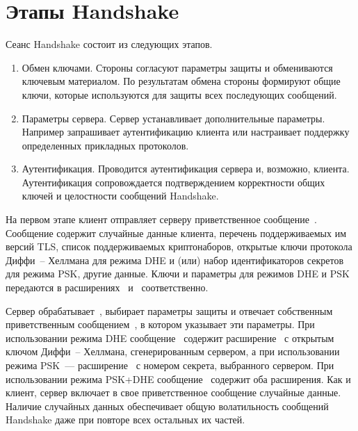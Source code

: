 \section{Этапы Handshake}\label{COMMON.Phases}

Сеанс Handshake состоит из следующих этапов.

\begin{enumerate}
\item
Обмен ключами. Стороны согласуют параметры защиты и обмениваются ключевым 
материалом. По результатам обмена стороны формируют общие ключи, которые 
используются для защиты всех последующих сообщений.

\item
Параметры сервера. Сервер устанавливает дополнительные параметры. Например 
запрашивает аутентификацию клиента или настраивает поддержку определенных 
прикладных протоколов.

\item
Аутентификация. Проводится аутентификация сервера и, возможно, клиента. 
Аутентификация сопровождается подтверждением корректности общих ключей и 
целостности сообщений Handshake.
\end{enumerate}


На первом этапе клиент отправляет серверу приветственное 
сообщение~.
%
Сообщение содержит случайные данные клиента, перечень поддерживаемых им 
версий TLS, список поддерживаемых криптонаборов, открытые ключи протокола 
Диффи~-- Хеллмана для режима DHE и (или) набор идентификаторов секретов для 
режима PSK, другие данные.
%
Ключи и параметры для режимов DHE и PSK передаются в 
расширениях~ и~ 
соответственно.

Сервер обрабатывает~, выбирает параметры защиты и 
отвечает собственным приветственным сообщением~, 
в котором указывает эти параметры.
%
При использовании режима DHE сообщение~ содержит
расширение~ с открытым ключом Диффи~-- Хеллмана, 
сгенерированным сервером, а при использовании режима PSK~--- 
расширение~ с номером секрета, выбранного 
сервером.
%
При использовании режима PSK+DHE сообщение~ содержит 
оба расширения.
%
Как и клиент, сервер включает в свое приветственное сообщение случайные данные.
Наличие случайных данных обеспечивает общую волатильность сообщений Handshake 
даже при повторе всех остальных их частей.

